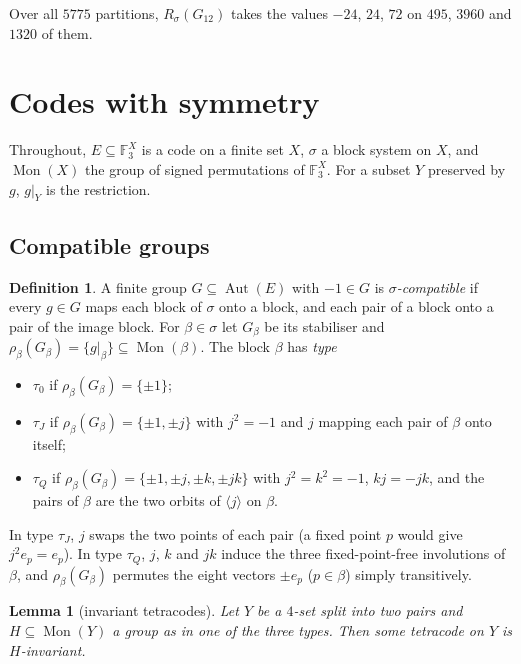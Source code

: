 \documentclass[11pt]{amsart}
\newtheorem{lemma}[theorem]{Lemma}
\theoremstyle{definition}
\newtheorem{definition}[theorem]{Definition}
\newcommand{\F}{\mathbb{F}_3}
\newcommand{\Aut}{\operatorname{Aut}}
\newcommand{\Mon}{\operatorname{Mon}}
\begin{document}
Over all $5775$ partitions, $R_\sigma(G_{12})$ takes the values $-24$, $24$, $72$ on $495$, $3960$ and
$1320$ of them.

\section{Codes with symmetry}\label{sec:sym}

Throughout, $E\subseteq\F^X$ is a code on a finite set $X$, $\sigma$ a block system on $X$, and
$\Mon(X)$ the group of signed permutations of $\F^X$. For a subset $Y$ preserved by $g$, $g|_Y$ is
the restriction.

\subsection{Compatible groups}

\begin{definition}\label{def:compatible}
A finite group $G\subseteq\Aut(E)$ with $-1\in G$ is \emph{$\sigma$-compatible} if every $g\in G$
maps each block of $\sigma$ onto a block, and each pair of a block onto a pair of the image block.
For $\beta\in\sigma$ let $G_\beta$ be its stabiliser and $\rho_\beta(G_\beta)=\{g|_\beta\}\subseteq
\Mon(\beta)$. The block $\beta$ has \emph{type}
\begin{itemize}
\item $\tau_0$ if $\rho_\beta(G_\beta)=\{\pm1\}$;
\item $\tau_J$ if $\rho_\beta(G_\beta)=\{\pm1,\pm j\}$ with $j^2=-1$ and $j$ mapping each pair of
  $\beta$ onto itself;
\item $\tau_Q$ if $\rho_\beta(G_\beta)=\{\pm1,\pm j,\pm k,\pm jk\}$ with $j^2=k^2=-1$, $kj=-jk$,
  and the pairs of $\beta$ are the two orbits of $\langle j\rangle$ on $\beta$.
\end{itemize}
\end{definition}

In type $\tau_J$, $j$ swaps the two points of each pair (a fixed point $p$ would give
$j^2e_p=e_p$). In type $\tau_Q$, $j$, $k$ and $jk$ induce the three fixed-point-free involutions of
$\beta$, and $\rho_\beta(G_\beta)$ permutes the eight vectors $\pm e_p$ ($p\in\beta$) simply
transitively.

\begin{lemma}[invariant tetracodes]\label{lem:invtetra}
Let $Y$ be a $4$-set split into two pairs and $H\subseteq\Mon(Y)$ a group as in one of the three
types. Then some tetracode on $Y$ is $H$-invariant.
\end{lemma}
\end{document}
